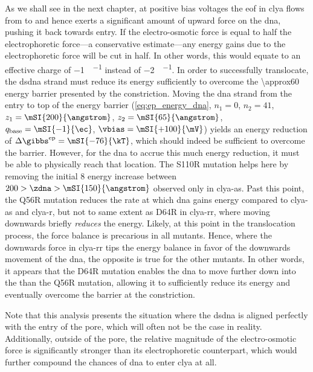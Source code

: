 As we shall see in the next chapter, at positive bias voltages the \gls{eof} in \gls{clya} flows from
\transi{} to \cisi{} and hence exerts a significant amount of upward force on the \gls{dna}, pushing it back
towards \cisi{} entry. If the electro-osmotic force is equal to half the electrophoretic force---a
conservative estimate---any energy gains due to the electrophoretic force will be cut in half. In other words,
this would equate to an effective charge of \SI{-1}{\ec\per\bp} instead of \SI{-2}{\ec\per\bp}. In order to
successfully translocate, the \gls{dsdna} strand must reduce its energy sufficiently to overcome the
\SI{\approx60}{\kT} energy barrier presented by the constriction.  Moving the \gls{dna} strand from the
\cisi{} entry to top of the energy barrier (\cref{eq:ep_energy_dna}, $n_1 = 0$, $n_2 = 41$, $z_1 =
\mSI{200}{\angstrom}$, $z_2 = \mSI{65}{\angstrom}$, $q_{\textrm{base}} = \mSI{-1}{\ec}$, $\vbias =
\mSI{+100}{\mV}$) yields an energy reduction of $\Delta \gibbs^{\textrm{ep}} = \mSI{-76}{\kT}$, which should
indeed be sufficient to overcome the barrier. However, for the \gls{dna} to accrue this much energy reduction,
it must be able to physically reach that location. The S110R mutation helps here by removing the initial
\SI{+8}{\kT} energy increase between $200 > \zdna > \mSI{150}{\angstrom}$ observed only in \gls{clya-as}. Past
this point, the Q56R mutation reduces the rate at which \gls{dna} gains energy compared to \gls{clya-as} and
\gls{clya-r}, but not to same extent as D64R in \gls{clya-rr}, where moving downwards briefly \emph{reduces}
the energy. Likely, at this point in the translocation process, the force balance is precarious in all
mutants. Hence, where the downwards force in \gls{clya-rr} tips the energy balance in favor of the downwards
movement of the \gls{dna}, the opposite is true for the other mutants. In other words, it appears that the
D64R mutation enables the \gls{dna} to move further down into the \lumen{} than the Q56R mutation, allowing it
to sufficiently reduce its energy and eventually overcome the barrier at the constriction.

Note that this analysis presents the situation where the \gls{dsdna} is aligned perfectly with the entry of
the pore, which will often not be the case in reality. Additionally, outside of the pore, the relative
magnitude of the electro-osmotic force is significantly stronger than its electrophoretic counterpart, which
would further compound the chances of \gls{dna} to enter \gls{clya} at all.

